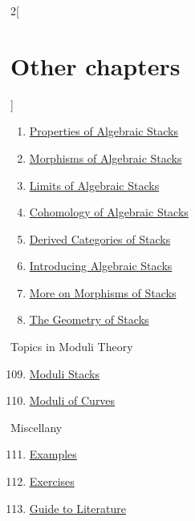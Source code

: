 \begin{multicols}{2}[\section{Other chapters}]
\begin{enumerate}
\item \href{https://github.com/stacks/stacks-project/blob/a04446e57ec1fbc252a871afcec7752fb2807b14/stacks-properties.tex}{Properties of Algebraic Stacks}
\item \href{https://github.com/stacks/stacks-project/blob/a04446e57ec1fbc252a871afcec7752fb2807b14/stacks-morphisms.tex}{Morphisms of Algebraic Stacks}
\item \href{https://github.com/stacks/stacks-project/blob/a04446e57ec1fbc252a871afcec7752fb2807b14/stacks-limits.tex}{Limits of Algebraic Stacks}
\item \href{https://github.com/stacks/stacks-project/blob/a04446e57ec1fbc252a871afcec7752fb2807b14/stacks-cohomology.tex}{Cohomology of Algebraic Stacks}
\item \href{https://github.com/stacks/stacks-project/blob/a04446e57ec1fbc252a871afcec7752fb2807b14/stacks-perfect.tex}{Derived Categories of Stacks}
\item \href{https://github.com/stacks/stacks-project/blob/a04446e57ec1fbc252a871afcec7752fb2807b14/stacks-introduction.tex}{Introducing Algebraic Stacks}
\item \href{https://github.com/stacks/stacks-project/blob/a04446e57ec1fbc252a871afcec7752fb2807b14/stacks-more-morphisms.tex}{More on Morphisms of Stacks}
\item \href{https://github.com/stacks/stacks-project/blob/a04446e57ec1fbc252a871afcec7752fb2807b14/stacks-geometry.tex}{The Geometry of Stacks}
\end{enumerate}
Topics in Moduli Theory
\begin{enumerate}
\setcounter{enumi}{108}
\item \href{https://github.com/stacks/stacks-project/blob/a04446e57ec1fbc252a871afcec7752fb2807b14/moduli.tex}{Moduli Stacks}
\item \href{https://github.com/stacks/stacks-project/blob/a04446e57ec1fbc252a871afcec7752fb2807b14/moduli-curves.tex}{Moduli of Curves}
\end{enumerate}
Miscellany
\begin{enumerate}
\setcounter{enumi}{110}
\item \href{https://github.com/stacks/stacks-project/blob/a04446e57ec1fbc252a871afcec7752fb2807b14/examples.tex}{Examples}
\item \href{https://github.com/stacks/stacks-project/blob/a04446e57ec1fbc252a871afcec7752fb2807b14/exercises.tex}{Exercises}
\item \href{https://github.com/stacks/stacks-project/blob/a04446e57ec1fbc252a871afcec7752fb2807b14/guide.tex}{Guide to Literature}

\end{enumerate}
\end{multicols}
